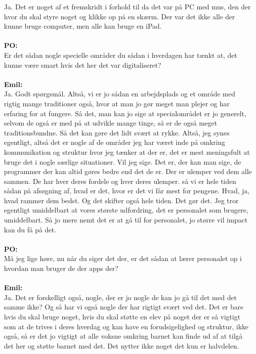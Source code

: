 Ja.
Det er noget af et fremskridt i forhold til da det var på PC med mus, den der hvor du skal styre noget og klikke op på en skærm.
Der var det ikke alle der kunne bruge computer, men alle kan bruge en iPad.
\\\\
\textbf{PO:} \\
Er det sådan nogle specielle områder du sådan i hverdagen har tænkt at, det kunne være smart hvis det her det var digitaliseret?
\\\\
\textbf{Emil:}\\
Ja. 
Godt spørgsmål.
Altså, vi er jo sådan en arbejdsplads og et område med rigtig mange traditioner også, hvor at man jo gør meget man plejer og har erfaring for at fungere. 
Så det, man kan jo sige at specialområdet er jo generelt, selvom de også er med på at udvikle mange tinge, så er de også meget traditionsbundne. 
Så det kan gøre det lidt svært at rykke.
Altså, jeg synes egentligt, altså det er nogle af de områder jeg har været inde på omkring kommunikation og struktur hvor jeg tænker at der er, det er mest meningsfult at bruge det i nogle særlige situationer.
Vil jeg sige.
Det er, der kan man sige, de programmer der kan altid gøres bedre end det de er. 
Der er ulemper ved dem alle sammen. 
De har hver deres fordele og hver deres ulemper.
så vi er hele tiden sådan på afsøgning af, hvad er det, hvor er det vi får mest for pengene.
Hvad, ja, hvad rammer dem bedst.
Og det skifter også hele tiden.
Det gør det.
Jeg tror egentligt umiddelbart at vores største udfordring, det er personalet som brugere, umiddelbart.
Så jo mere nemt det er at gå til for personalet, jo større vil impact kan du få på det.
\\\\
\textbf{PO:}\\
Må jeg lige høre, nu når du siger det der, er det sådan at lærer personalet op i hvordan man bruger de der apps der?
\\\\
\textbf{Emil:}\\
Ja.
Det er forskelligt også, nogle, der er jo nogle de kan jo gå til det med det samme ikke? 
Og så har vi også nogle der har rigtigt svært ved det.
Det er bare hvis du skal bruge noget, hvis du skal støtte en elev på noget der er så vigtigt som at de trives i deres hverdag og kan have en forudsigelighed og struktur, ikke også, så er det jo vigtigt at alle voksne omkring barnet kan finde ud af at tilgå det her og støtte barnet med det.
Det nytter ikke noget det kun er halvdelen.
